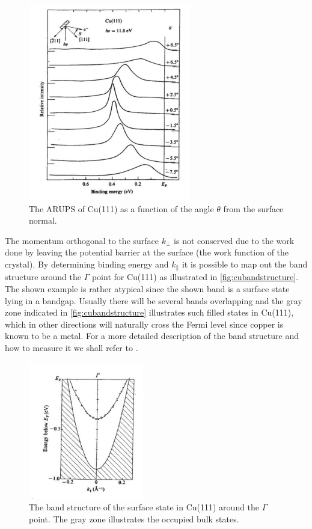 \begin{figure}[h!]
	\begin{center}
	\includegraphics[scale=4]{figures/05_04.png}
	\caption{The ARUPS of Cu(111) as a function of the angle $\theta$ from the surface normal.}
	\label{fig:cuarups}
	\end{center}
\end{figure}

The momentum orthogonal to the surface $k_{\perp}$ is not conserved due to the work done by leaving the potential barrier at the surface (the work function of the crystal). By determining binding energy and $k_\parallel$ it is possible to map out the band structure around the $\Gamma$ point for Cu(111) as illustrated in \autoref{fig:cubandstructure}. The shown example is rather atypical since the shown band is a surface state lying in a bandgap. Usually there will be several bands overlapping and the gray zone indicated in \autoref{fig:cubandstructure} illustrates such  filled states in Cu(111), which in other directions will naturally cross the Fermi level since copper is known to be a metal. For a more detailed description of the band structure and how to measure it  we shall refer to \cite{Neddermeyer, Kevan}.

\begin{figure}[h!]
	\begin{center}
	\includegraphics[scale=4]{figures/05_05.png}
	\caption{The band structure of the surface state in Cu(111) around the $\Gamma$ point. The gray zone illustrates the occupied bulk states.}
	\label{fig:cubandstructure}
	\end{center}
\end{figure}

